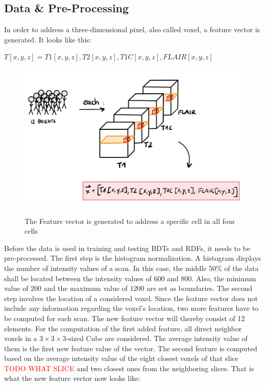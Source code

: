 \documentclass[
12pt,
headsepline,
bibliography=totoc,
twoside=semi,
fleqn
]{scrartcl}
\begin{document}
 \subsection{Data \& Pre-Processing\label{sec:sec3-2}}
 In order to address a three-dimensional pixel, also called voxel, a feature vector is generated. It looks like this:\\
 
 \begin{center} $T[x,y,z] = T1[x,y,z], T2[x,y,z], T1C[x,y,z], FLAIR[x,y,z]$\end{center}

 \begin{figure}[H]
 \centering \includegraphics[scale=0.6]{BDT14.png}\label{fig:fig14}
 \caption{The Feature vector is generated to address a specific cell in all four cells}
 \end{figure}

 Before the data is used in training and testing BDTs and RDFs, it needs to be pre-processed. The first step is the histogram normalization. A histogram displays the number of intensity values of a scan. In this case, the middle 50$\%$ of the data shall be located between the intensity values of $600$ and $800$. Also, the minimum value of $200$ and the maximum value of $1200$ are set as boundaries. The second step involves the location of a considered voxel. Since the feature vector does not include any information regarding the voxel's location, two more features have to be computed for each scan. The new feature vector will thereby consist of 12 elements. For the computation of the first added feature, all direct neighbor voxels in a $3 \times 3 \times 3$-sized Cube are considered. The average intensity value of them is the first new feature value of the vector. The second feature is computed based on the average intensity value of the eight closest voxels of that slice \textcolor{red}{TODO WHAT SLICE} and two closest ones from the neighboring slices. That is what the new feature vector now looks like: 
\end{document}
